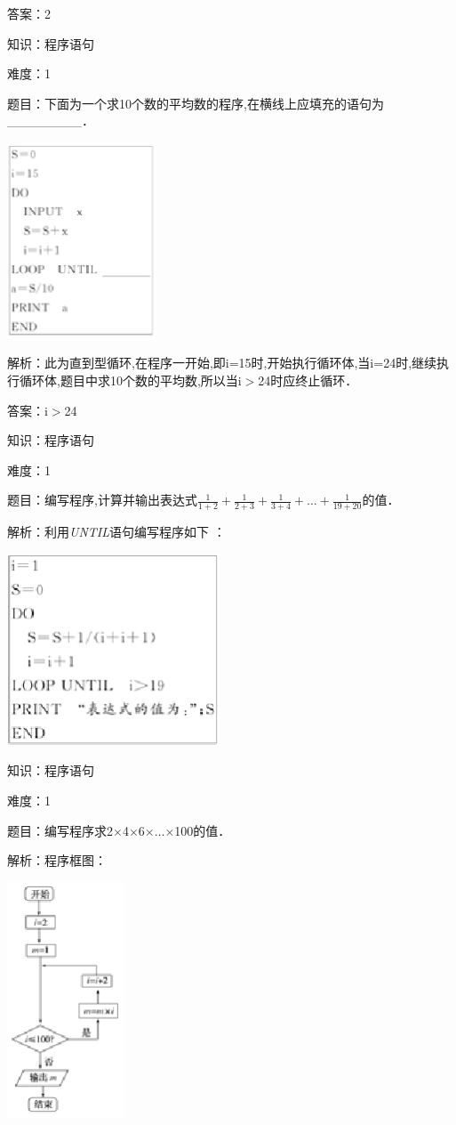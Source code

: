 \documentclass{article} %
\begin{document}
答案：2

知识：程序语句

难度：1

题目：下面为一个求10个数的平均数的程序,在横线上应填充的语句为\_\_\_\_\_\_\_\_．

\includegraphics*[width=1.75in, height=2.29in, keepaspectratio=false]{image66}

解析：此为直到型循环,在程序一开始,即i=15时,开始执行循环体,当i=24时,继续执行循环体,题目中求10个数的平均数,所以当i$\mathrm{>}$24时应终止循环．

答案：i$\mathrm{>}$24

知识：程序语句

难度：1

题目：编写程序,计算并输出表达式$\frac{1}{1+2}+\frac{1}{2+3}+\frac{1}{3+4}+\dots+\frac{1}{19+20}$的值．

解析：利用\textit{UNTIL}语句编写程序如下 ：

\includegraphics*[width=2.49in, height=2.25in, keepaspectratio=false]{image67}

知识：程序语句

难度：1

题目：编写程序求2$\mathrm{\times}$4$\mathrm{\times}$6$\mathrm{\times}$$\dots$$\mathrm{\times}$100的值．

解析：程序框图：

\includegraphics*[width=1.38in, height=2.77in, keepaspectratio=false]{image68}
\end{document}
